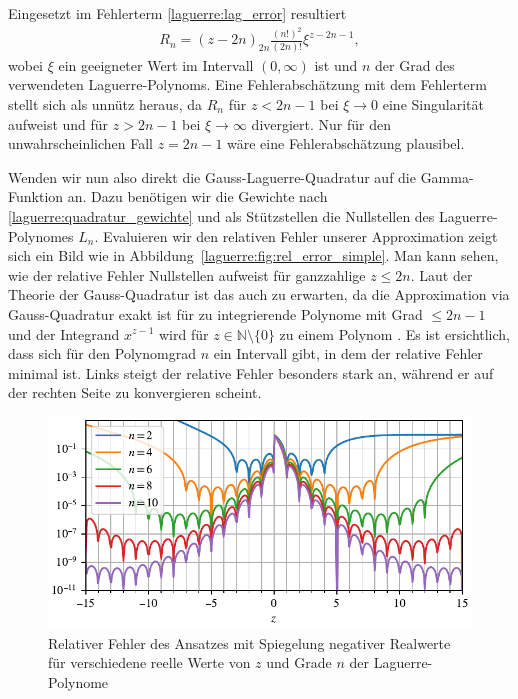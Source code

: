 Eingesetzt im Fehlerterm \eqref{laguerre:lag_error} resultiert
\begin{align}
R_n
=
(z - 2n)_{2n} \frac{(n!)^2}{(2n)!} \xi^{z-2n-1}
,
\label{laguerre:gamma_err_simple}
\end{align}
wobei $\xi$ ein geeigneter Wert im Intervall $(0, \infty)$ ist
und $n$ der Grad des verwendeten Laguerre-Polynoms.
Eine Fehlerabschätzung mit dem Fehlerterm stellt sich als unnütz heraus,
da $R_n$ für $z < 2n - 1$ bei $\xi \rightarrow 0$ eine Singularität aufweist
und für $z > 2n - 1$ bei $\xi \rightarrow \infty$ divergiert.
Nur für den unwahrscheinlichen Fall $ z = 2n - 1$
wäre eine Fehlerabschätzung plausibel.

Wenden wir nun also direkt die Gauss-Laguerre-Quadratur
auf die Gamma-Funktion an.
Dazu benötigen wir die Gewichte nach
\eqref{laguerre:quadratur_gewichte}
und als Stützstellen die Nullstellen des Laguerre-Polynomes $L_n$.
Evaluieren wir den relativen Fehler unserer Approximation zeigt sich ein
Bild wie in Abbildung~\ref{laguerre:fig:rel_error_simple}.
Man kann sehen,
wie der relative Fehler Nullstellen aufweist für ganzzahlige $z \leq 2n$.
Laut der Theorie der Gauss-Quadratur ist das auch zu erwarten,
da die Approximation via Gauss-Quadratur
exakt ist für zu integrierende Polynome mit Grad $\leq 2n-1$ und
der Integrand $x^{z-1}$ wird für $z \in \mathbb{N} \setminus \{0\}$
zu einem Polynom .
Es ist ersichtlich,
dass sich für den Polynomgrad $n$ ein Intervall gibt,
in dem der relative Fehler minimal ist.
Links steigt der relative Fehler besonders stark an,
während er auf der rechten Seite zu konvergieren scheint.

\begin{figure}
\centering
% 
\includegraphics{papers/laguerre/images/rel_error_mirror.pdf}
\caption{Relativer Fehler des Ansatzes mit Spiegelung negativer Realwerte
für verschiedene reelle Werte von $z$ und Grade $n$ der Laguerre-Polynome}
\label{laguerre:fig:rel_error_mirror}
\end{figure}

